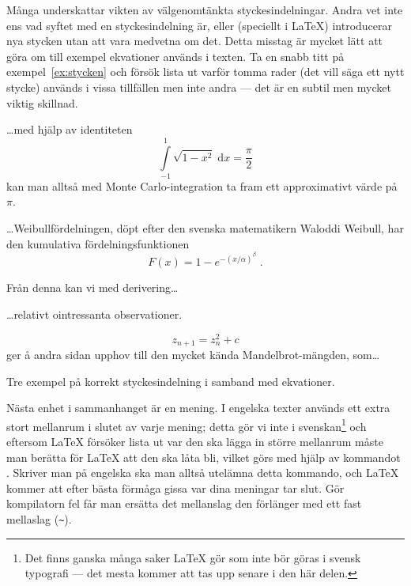\documentclass[../../latex.tex]{subfiles}
\begin{document}
Många underskattar vikten av välgenomtänkta styckesindelningar. Andra vet
inte ens vad syftet med en styckesindelning är, eller (speciellt i 
\LaTeX{}) introducerar nya stycken utan att vara medvetna om det. Detta
misstag är mycket lätt att göra om till exempel ekvationer används i 
texten. Ta
en snabb titt på exempel~\vref{ex:stycken} och försök lista ut varför
tomma rader (det vill säga ett nytt stycke) används i vissa tillfällen 
men inte andra — det är en subtil men mycket viktig skillnad.

\begin{kod}[p]
	\begin{latexcode}
\ldots{}med hjälp av identiteten
\begin{equation}
\int\limits_{-1}^1\!\sqrt{1-x^2}\;\mathrm{d}x
= \frac{\pi}{2}
\end{equation}
kan man alltså med Monte Carlo-integration ta fram
ett approximativt värde på \(\pi\).

\ldots{}Weibullfördelningen, döpt efter den svenska
matematikern Waloddi Weibull, har den kumulativa
fördelningsfunktionen
\begin{equation}
F(x) = 1 - e^{-(x/\alpha)^\beta} \;.
\end{equation}

Från denna kan vi med derivering\ldots{}

\ldots{}relativt ointressanta observationer.

\begin{equation}
z_{n+1} = z_n^2 + c
\end{equation}
ger å andra sidan upphov till den mycket kända
Mandelbrot-mängden, som\ldots{}

	\end{latexcode}
	\caption{Tre exempel på korrekt styckesindelning i samband med
	ekvationer.}
	\label{ex:stycken}
\end{kod}

Nästa enhet i sammanhanget är en mening. I engelska texter används ett
extra stort mellanrum i slutet av varje mening; detta gör vi inte i
svenskan\footnote{Det finns ganska många saker \LaTeX{} gör som inte bör
göras i svensk typografi — det mesta kommer att tas upp senare i den här 
delen.} och eftersom \LaTeX{} försöker lista ut var den ska lägga in
större mellanrum måste man berätta för \LaTeX{} att den ska låta bli,
vilket görs
med hjälp av kommandot . Skriver man på engelska ska
man alltså utelämna detta kommando, och \LaTeX{} kommer att efter bästa
förmåga gissa var dina meningar tar slut. Gör kompilatorn fel får man 
ersätta det mellanslag den förlänger med ett fast mellaslag (\verb|~|).
\end{document}
